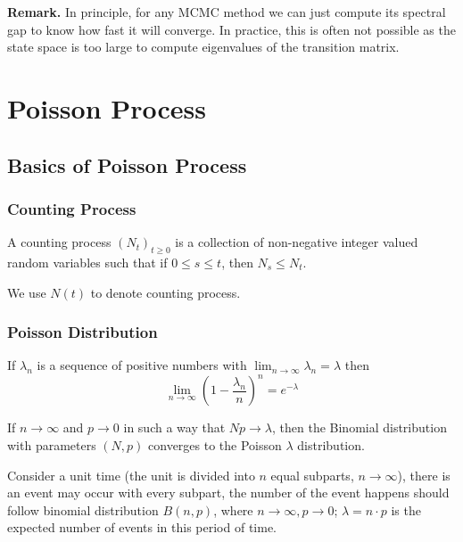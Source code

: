 \documentclass[11pt]{elegantbook}
\begin{document}
\textbf{Remark.} In principle, for any MCMC method we can just compute its spectral gap to know how fast it will converge. In practice, this is often not possible as the state space is too large to compute eigenvalues of the transition matrix.









\chapter{Poisson Process}

\section{Basics of Poisson Process}
\subsection{Counting Process}
\begin{definition}
    A counting process $(N_t)_{t\geq0}$ is a collection of non-negative integer valued random variables such that if $0 \leq s \leq t$, then $N_s \leq N_t$.
\end{definition}
We use $N(t)$ to denote counting process.

\subsection{Poisson Distribution}
\begin{lemma}
    If $\lambda_n$ is a sequence of positive numbers with $\lim_{n \rightarrow \infty}\lambda_n=\lambda$ then $$\lim_{n \rightarrow \infty}\left(1-\frac{\lambda_n}{n}\right)^n=e^{-\lambda}$$
\end{lemma}

\begin{theorem}
    If $n \rightarrow  \infty$ and $p \rightarrow 0$ in such a way that $Np \rightarrow \lambda$, then the Binomial distribution with parameters $(N,p)$ converges to the Poisson $\lambda$ distribution.
\end{theorem}
Consider a unit time (the unit is divided into $n$ equal subparts, $n \rightarrow \infty$), there is an event may occur with every subpart, the number of the event happens should follow binomial distribution $B(n,p)$, where $n \rightarrow \infty, p \rightarrow 0$; $\lambda=n\cdot p$ is the expected number of events in this period of time.
\end{document}
